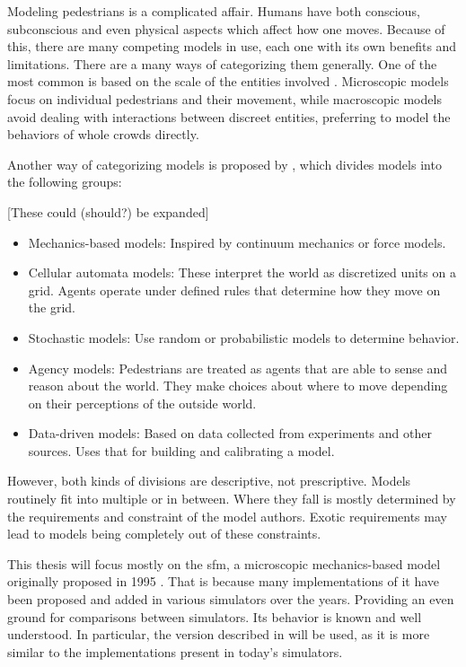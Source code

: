 \documentclass[twoside, 11pt]{article}
\begin{document}
Modeling pedestrians is a complicated affair. Humans have both conscious, subconscious and even physical aspects which affect how one moves. Because of this, there are many competing models in use, each one with its own benefits and limitations. There are a many ways of categorizing them generally. One of the most common is based on the scale of the entities involved \cite{kleinmeierVadereOpenSourceSimulation2019}. Microscopic models focus on individual pedestrians and their movement, while macroscopic models avoid dealing with interactions between discreet entities, preferring to model the behaviors of whole crowds directly.

Another way of categorizing models is proposed by \cite{martinez-gilModelingEvaluationScale2017}, which divides models into the following groups:

[These could (should?) be expanded]

\begin{itemize}
  \item Mechanics-based models: Inspired by continuum mechanics or force models.
  \item Cellular automata models: These interpret the world as discretized units on a grid. Agents operate under defined rules that determine how they move on the grid.
  \item Stochastic models: Use random or probabilistic models to determine behavior.
  \item Agency models: Pedestrians are treated as agents that are able to sense and reason about the world. They make choices about where to move depending on their perceptions of the outside world.
  \item Data-driven models: Based on data collected from experiments and other sources. Uses that for building and calibrating a model.
\end{itemize}

However, both kinds of divisions are descriptive, not prescriptive. Models routinely fit into multiple or in between. Where they fall is mostly determined by the requirements and constraint of the model authors. Exotic requirements may lead to models being completely out of these constraints.

This thesis will focus mostly on the \gls{sfm}, a microscopic mechanics-based model originally proposed in 1995 \cite{helbingSocialForceModel1995}. That is because many implementations of it have been proposed and added in various simulators over the years. Providing an even ground for comparisons between simulators. Its behavior is known and well understood. In particular, the version described in \cite{helbingSimulatingDynamicFeatures2000} will be used, as it is more similar to the implementations present in today's simulators.
\end{document}
